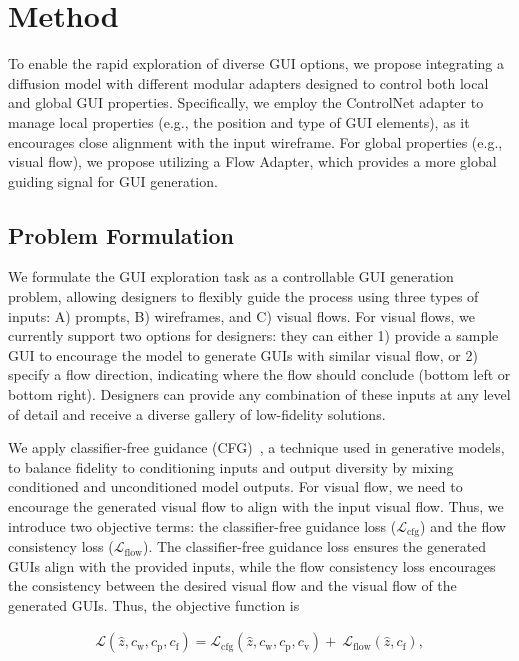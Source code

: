 \section{Method}
\label{sec:synthesis}




To enable the rapid exploration of diverse GUI options, we propose integrating a diffusion model with different modular adapters designed to control both local and global GUI properties. Specifically, we employ the ControlNet adapter to manage local properties (e.g., the position and type of GUI elements), as it encourages close alignment with the input wireframe. For global properties (e.g., visual flow), we propose utilizing a Flow Adapter, which provides a more global guiding signal for GUI generation.

\subsection{Problem Formulation}

We formulate the GUI exploration task as a controllable GUI generation problem, allowing designers to flexibly guide the process using three types of inputs: A) prompts, B) wireframes, and C) visual flows. For visual flows, we currently support two options for designers: they can either 1) provide a sample GUI to encourage the model to generate GUIs with similar visual flow, or 2) specify a flow direction, indicating where the flow should conclude (bottom left or bottom right).
Designers can provide any combination of these inputs at any level of detail and receive a diverse gallery of low-fidelity solutions. 

We apply classifier-free guidance (CFG)~\cite{cfg}, a technique used in generative models, to balance fidelity to conditioning inputs and output diversity by mixing conditioned and unconditioned model outputs.
For visual flow, we need to encourage the generated visual flow to align with the input visual flow.
Thus, we introduce two objective terms: the classifier-free guidance loss ($\mathcal{L}_{\textrm{cfg}}$) and the flow consistency loss ($\mathcal{L}_{\textrm{flow}}$). The classifier-free guidance loss ensures the generated GUIs align with the provided inputs, while the flow consistency loss encourages the consistency between the desired visual flow and the visual flow of the generated GUIs. Thus, the objective function is 

\begin{equation}
\label{eq:objective_function}
\begin{split}
\mathcal{L}(\hat{z}, c_\mathrm{w}, c_\mathrm{p}, c_\mathrm{f}) = \mathcal{L}_{\mathrm{cfg}}(\hat{z}, c_\mathrm{w}, c_\mathrm{p}, c_\mathrm{v}) +  ~\mathcal{L}_{\mathrm{flow}}(\hat{z}, c_\mathrm{f}),
\end{split}
\end{equation}

